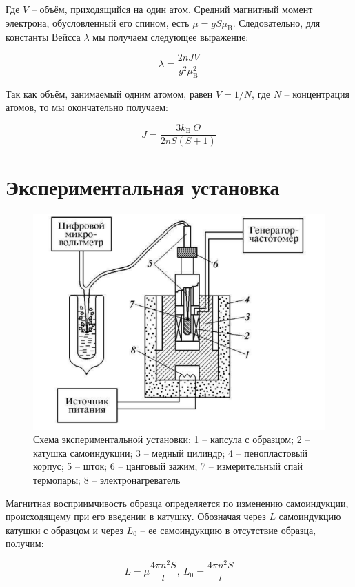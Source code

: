 \documentclass[a4paper,12pt]{article}
\begin{document}
Где $V$ -- объём, приходящийся на один атом. Средний магнитный момент электрона, обусловленный его спином, есть $\mu=g S \mu_{\text{B}}$. Следовательно, для константы Вейсса $\lambda$ мы получаем следующее выражение:

$$
\lambda=\frac{2 n J V}{g^{2} \mu_{\mathrm{B}}^{2}}
$$

Так как объём, занимаемый одним атомом, равен $V=1/N$, где $N$ -- концентрация атомов, то мы окончательно получаем:

\begin{equation} \label{obm_int}
J=\frac{3 k_{\text {B }} \Theta}{2 n S(S+1)}
\end{equation}


\section*{Экспериментальная установка}

\begin{figure}[h!]
	\centering
	\includegraphics[scale=1]{setup}
	\caption{Схема экспериментальной установки: 1 -- капсула с образцом; 2 -- катушка самоиндукции; 3 -- медный цилиндр; 4 -- пенопластовый корпус; 5 -- шток; 6 -- цанговый зажим; 7 -- измерительный спай термопары; 8 -- электронагреватель} 
\end{figure}

Магнитная восприимчивость образца определяется по изменению самоиндукции, происходящему при его введении в катушку. Обозначая через $L$ самоиндукцию катушки с образцом и через $L_0$ -- ее самоиндукцию в отсутствие образца, получим:

$$
	L = \mu \frac{4 \pi n^2 S}{l}, \ L_0 = \frac{4 \pi n^2 S}{l}
$$
\end{document}

